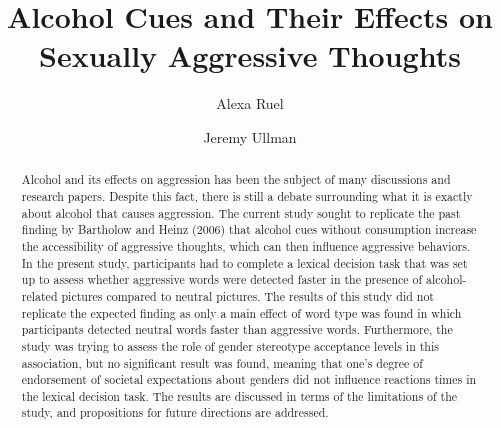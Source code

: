 \documentclass[authordate, serif, review]{jote-article}
\title{Alcohol Cues and Their Effects on Sexually Aggressive Thoughts}
\author[1]{Alexa Ruel}
\author[2]{Jeremy Ullman}
\affil[1]{Reviewer 1}
\affil[2]{Reviewer 2}
\begin{document}
\begin{frontmatter}
\maketitle

\begin{abstract}

\noindent Alcohol and its effects on aggression has been the subject of many discussions and research papers. Despite this fact, there is still a debate surrounding what it is exactly about alcohol that causes aggression. The current study sought to replicate the past finding by Bartholow and Heinz (2006) that alcohol cues without consumption increase the accessibility of aggressive thoughts, which can then influence aggressive behaviors. In the present study, participants had to complete a lexical decision task that was set up to assess whether aggressive words were detected faster in the presence of alcohol-related pictures compared to neutral pictures. The results of this study did not replicate the expected finding as only a main effect of word type was found in which participants detected neutral words faster than aggressive words. Furthermore, the study was trying to assess the role of gender stereotype acceptance levels in this association, but no significant result was found, meaning that one's degree of endorsement of societal expectations about genders did not influence reactions times in the lexical decision task. The results are discussed in terms of the limitations of the study, and propositions for future directions are addressed.

\end{abstract}
\end{frontmatter}
\end{document}
